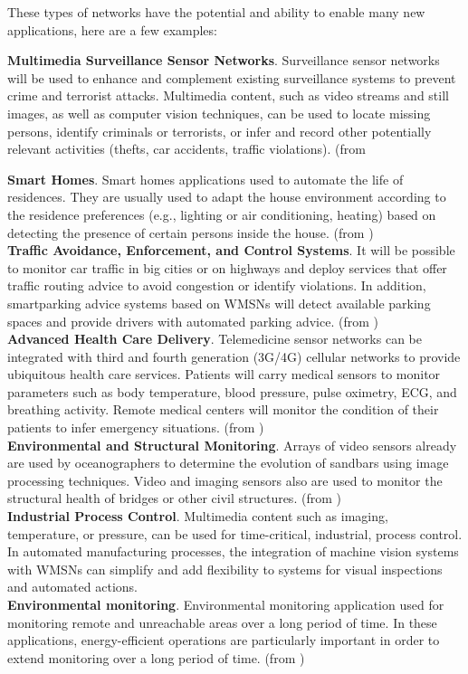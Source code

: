 \documentclass[conference]{IEEEtran}
\begin{document}
\par \indent These types of networks have the potential and ability to enable many new applications, here are a few examples:
\par \indent \textbf{Multimedia Surveillance Sensor Networks}. Surveillance sensor networks will be used to enhance and complement existing surveillance systems to prevent crime and terrorist attacks. Multimedia content, such as video streams and still images, as well as computer vision techniques, can be used to locate missing persons, identify criminals or terrorists, or infer and record other potentially relevant activities (thefts, car accidents, traffic violations). (from \citet{Inaf02}
\par \indent \textbf{Smart Homes}. Smart homes applications used to automate the life of residences. They are usually used to adapt the house environment according to the residence preferences (e.g., lighting or air conditioning, heating) based on detecting the presence of certain persons inside the house.  (from \citet{Mar04})
\\ \indent \textbf{Traffic Avoidance, Enforcement, and Control Systems}. It will be possible to monitor car traffic in big cities or on highways and deploy services that offer traffic routing advice to avoid congestion or identify violations. In addition, smartparking advice systems based on WMSNs will detect available parking spaces and provide drivers with automated parking advice. (from \citet{Hamd01})
\\ \indent \textbf{Advanced Health Care Delivery}. Telemedicine sensor networks can be integrated with third and fourth generation (3G/4G) cellular networks to provide ubiquitous health care services. Patients will carry medical sensors to monitor parameters such as body temperature, blood pressure, pulse oximetry, ECG, and breathing activity. Remote medical centers will monitor the condition of their patients to infer emergency situations. (from \citet{Hamd01})
\\ \indent \textbf{Environmental and Structural Monitoring}. Arrays of video sensors already are used by oceanographers to determine the evolution of sandbars using image processing techniques. Video and imaging sensors also are used to monitor the structural health of bridges or other civil structures. (from \citet{Hamd01})
\\ \indent \textbf{Industrial Process Control}. Multimedia content such as imaging, temperature, or pressure, can be used for time-critical, industrial, process control. In automated manufacturing processes, the integration of machine vision systems with WMSNs can simplify and add flexibility to systems for visual inspections and automated actions. \citet{Inaf02}
\\ \indent \textbf{Environmental monitoring}. Environmental monitoring application used for monitoring remote and unreachable areas over a long period of time. In these applications, energy-efficient operations are particularly important in order to extend monitoring over a long period of time. (from \citet{Mar04})
\end{document}
